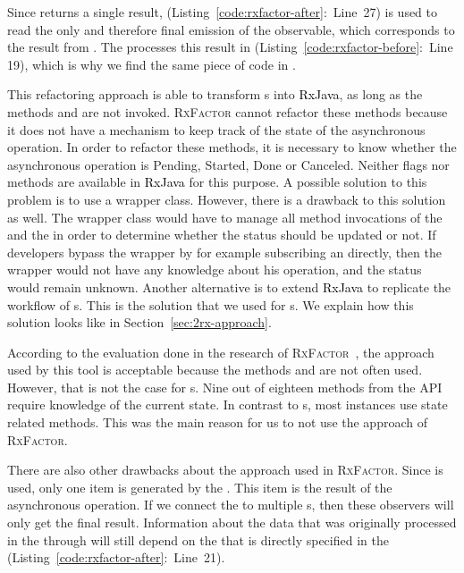 \documentclass[type=bsc,accentcolor=tud9c]{tudthesis}
\newcommand{\framework}[1]{\textcolor{black}{#1}}
\begin{document}
Since  returns a single result,  (Listing~\ref{code:rxfactor-after}:~Line~27) is used to read the only and therefore final emission of the observable, which corresponds to the result from . The  processes this result in  (Listing~\ref{code:rxfactor-before}:~Line 19), which is why we find the same piece of code in .




This refactoring approach is able to transform s into \framework{RxJava}, as long as the methods  and  are not invoked.  \textsc{RxFactor} cannot refactor these methods because it does not have a mechanism to keep track of the state of the asynchronous operation. In order to refactor these methods, it is necessary to know whether the asynchronous operation is Pending, Started, Done or Canceled. Neither flags nor methods are available in \framework{RxJava} for this purpose. A possible solution to this problem is to use a wrapper class. However, there is a drawback to this solution as well. The wrapper class would have to manage all method invocations of the  and the  in order to determine whether the status should be updated or not. If developers bypass the wrapper by for example subscribing an  directly, then the wrapper would not have any knowledge about his operation, and the status would remain unknown. Another alternative is to extend \framework{RxJava} to replicate the workflow of s. This is the solution that we used for s. We explain how this solution looks like in Section~\ref{sec:2rx-approach}.

According to the evaluation done in the research of \textsc{RxFactor}~\cite{thesisRxFactor}, the approach used by this tool is acceptable because the methods  and  are not often used. However, that is not the case for s. Nine out of eighteen methods from the  API require knowledge of the current state. In contrast to s, most  instances use state related methods. This was the main reason for us to not use the approach of \textsc{RxFactor}.

There are also other drawbacks about the approach used in \textsc{RxFactor}. Since  is used, only one item is generated by the . This item is the result of the asynchronous operation. If we connect the  to multiple s, then these observers will only get the final result. Information about the data that was originally processed in the  through  will still depend on the  that is directly specified in the  (Listing~\ref{code:rxfactor-after}:~Line~21).
\end{document}
